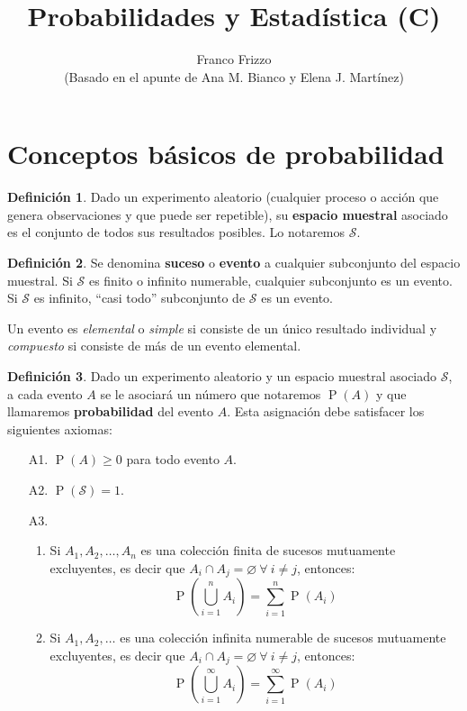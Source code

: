 \documentclass[11pt]{article}
\theoremstyle{plain}
\theoremstyle{definition}
\newtheorem*{defi}{Definición}
\theoremstyle{remark}
\newcommand{\deft}[1]{\textbf{#1}}  %
\newcommand{\proba}{\ensuremath{\operatorname{P}}}  %
\newcommand{\espm}[0]{\ensuremath{\mathcal{S}}}  %
\newcommand{\foralle}{\ensuremath{\forall \ }}  %
\begin{document}
\title{Probabilidades y Estadística (C)}
\author{Franco Frizzo \\ \small (Basado en el apunte de Ana M. Bianco y Elena J. Martínez)}
\date{}
\maketitle
\tableofcontents
\newpage

\section{Conceptos básicos de probabilidad}

  \begin{defi}
    Dado un experimento aleatorio (cualquier proceso o acción que genera observaciones y que puede ser repetible), su \deft{espacio muestral} asociado es el conjunto de todos sus resultados posibles. Lo notaremos $\espm$.
  \end{defi}

  \begin{defi}
    Se denomina \deft{suceso} o \deft{evento} a cualquier subconjunto del espacio muestral. Si $\espm$ es finito o infinito numerable, cualquier subconjunto es un evento. Si $\espm$ es infinito, “casi todo” subconjunto de $\espm$ es un evento.

    Un evento es \emph{elemental} o \emph{simple} si consiste de un único resultado individual y \emph{compuesto} si consiste de más de un evento elemental.
  \end{defi}

  \begin{defi}
    Dado un experimento aleatorio y un espacio muestral asociado $\espm$, a cada evento $A$ se le asociará un número que notaremos $\proba(A)$ y que llamaremos \deft{probabilidad} del evento $A$. Esta asignación debe satisfacer los siguientes axiomas:
    \begin{enumerate}
      \item[A1.] $\proba(A) \geq 0$ para todo evento $A$.
      \item[A2.] $\proba(\espm) = 1$.
      \item[A3.] \begin{enumerate}
        \item Si $A_1, A_2, \dots, A_n$ es una colección finita de sucesos mutuamente excluyentes, es decir que $A_i \cap A_j = \varnothing \ \foralle i \neq j$, entonces:
        \[ \proba\left( \bigcup_{i=1}^n A_i \right) = \sum_{i=1}^n \proba(A_i) \]
        \item Si $A_1, A_2, \dots$ es una colección infinita numerable de sucesos mutuamente excluyentes, es decir que $A_i \cap A_j = \varnothing \ \foralle i \neq j$, entonces:
        \[ \proba\left( \bigcup_{i=1}^\infty A_i \right) = \sum_{i=1}^\infty \proba(A_i) \]
      \end{enumerate}
    \end{enumerate}
  \end{defi}
\end{document}
